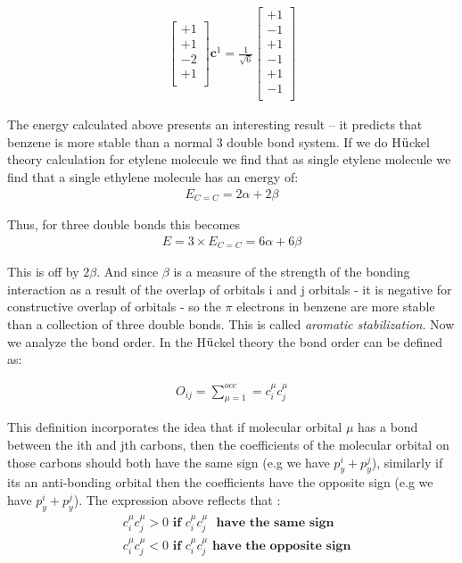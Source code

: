 \documentclass[9pt,twocolumn,twoside]{optica}
\begin{document}
\begin{align}
\begin{bmatrix}
    +1\\
    +1\\
    -2\\
    +1\\   
\end{bmatrix}
\textbf{c}^1=\frac{1}{\sqrt{6}}
\begin{bmatrix}
    +1\\
    -1\\
    +1\\
    -1\\
    +1\\
    -1\\   
\end{bmatrix}
 \label{eq:pHmat}
\end{align}



The energy calculated above presents an interesting result -- it predicts that benzene is more stable than a normal 3 double bond system. If we do  H$\ddot{\text u}$ckel theory calculation for etylene molecule we find that as single etylene molecule we find that a single ethylene molecule has an energy of:
\begin{align}
E_{C=C}=2\alpha+2\beta
 \label{eq:ethy}
\end{align}

Thus, for three double bonds this becomes 
\begin{align}
E= 3 \times E_{C=C}=6\alpha+6\beta
 \label{eq:sta}
 \end{align}

This is off by $2\beta$. And since $\beta$  is a measure of the strength of the bonding interaction as a result of the overlap of orbitals i and j orbitals - it is negative for constructive overlap of orbitals - so the $\pi$ electrons in benzene are more stable than a collection of three double bonds. This is called \textit{aromatic stabilization}. 
Now we analyze the bond order. In the  H$\ddot{\text u}$ckel theory the bond order can be defined as:

\begin{align}
O_{ij} =\sum_{\mu=1}^{occ}=c_i^\mu c_j^\mu 
 \label{eq:bond1}
 \end{align}

This definition incorporates the idea that if molecular orbital $\mu$ has a bond between the ith and jth carbons, then the coefficients of the molecular orbital on those carbons should both have the same sign (e.g we have $p_y^{i}+p_y^{j}$), similarly if its an anti-bonding orbital then the coefficients have the opposite sign  (e.g we have $p_y^{i}+p_y^{j}$). The expression above reflects that :
\begin{align}
& c_i^\mu c_j^\mu >0 \, \, \textbf{if} \, \, c_i^\mu c_j^\mu  \,\,\textbf{ have the same sign} \\
& c_i^\mu c_j^\mu <0 \, \, \textbf{if}  \, \,c_i^\mu c_j^\mu  \,\, \textbf{have the opposite sign}
 \label{eq:bond2}
 \end{align} 
 
\end{document}
